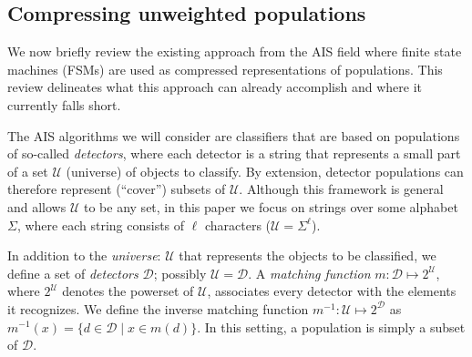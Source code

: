 \documentclass{llncs}
\begin{document}
\subsection{Compressing unweighted populations}

\label{sectionunweightedrep}

We now briefly review the existing approach from the AIS field where finite state machines
(FSMs) are used as compressed representations of populations.
This review %
delineates what this approach %
can already accomplish and where it currently falls short.

The AIS algorithms we will consider are classifiers 
that are based on populations of so-called 
%
\emph{detectors},
where each detector is a string that represents
a small part of a set $\mathcal{U}$ (universe) of objects to classify. By extension, detector populations can therefore 
represent  (``cover'') subsets of $\mathcal{U}$. Although this framework is general and allows 
$\mathcal{U}$ to be any set, in this paper we focus on strings over some alphabet 
$\Sigma$, where each string consists of $\ell$ characters ($\mathcal{U}=\Sigma^\ell$).


In addition to the \emph{universe}: $\mathcal{U}$ that represents the objects to be classified, we define a set of \emph{detectors} $\mathcal{D}$; possibly $\mathcal{U}=\mathcal{D}$. A \emph{matching function} $m : \mathcal{D} \mapsto 2^\mathcal{U}$, where $2^\mathcal{U}$ denotes the powerset of $\mathcal{U}$, associates every detector with the elements it recognizes. We define the inverse matching function $m^{-1} : \mathcal{U} \mapsto 2^\mathcal{D}$ as $m^{-1}(x) = \{ d \in \mathcal{D} \mid x \in m(d) \} $. In this setting, a population is simply a subset of $\mathcal{D}$. 
\end{document}
